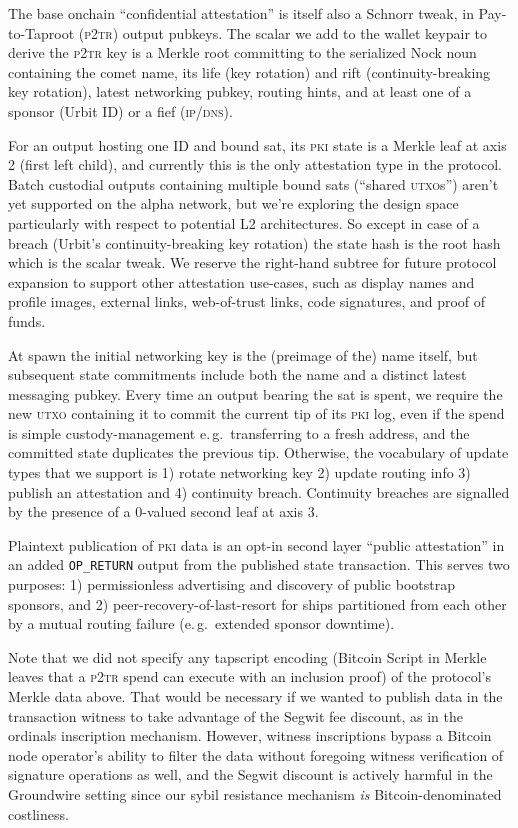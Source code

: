 \documentclass[twoside]{article}
\begin{document}
The base onchain ``confidential attestation'' is itself also a Schnorr
tweak, in Pay-to-Taproot (\textsc{p2tr}) output pubkeys. The scalar we add to the
wallet keypair to derive the \textsc{p2tr} key is a Merkle root committing to the
serialized Nock noun containing the comet name, its life (key rotation)
and rift (continuity-breaking key rotation), latest networking pubkey,
routing hints, and at least one of a sponsor (Urbit ID) or a fief
(\textsc{ip/dns}).

For an output hosting one ID and bound sat, its \textsc{pki} state is a Merkle
leaf at axis 2 (first left child), and currently this is the only
attestation type in the protocol. Batch custodial outputs containing
multiple bound sats (``shared \textsc{utxo}s'') aren't yet supported on the alpha
network, but we're exploring the design space particularly with respect
to potential L2 architectures. So except in case of a breach (Urbit's continuity-breaking key rotation)
the state hash is the root hash which is the scalar tweak. We reserve
the right-hand subtree for future protocol expansion to support other
attestation use-cases, such as display names and profile images,
external links, web-of-trust links, code signatures, and proof of funds.

At spawn the initial networking key is the (preimage of the) name
itself, but subsequent state commitments include both the name and a
distinct latest messaging pubkey. Every time an output bearing the sat
is spent, we require the new \textsc{utxo} containing it to commit the current
tip of its \textsc{pki} log, even if the spend is simple custody-management
e.\,g.\ transferring to a fresh address, and the committed state duplicates
the previous tip. Otherwise, the vocabulary of update types that we
support is 1) rotate networking key 2) update routing info 3) publish an
attestation and 4) continuity breach. Continuity breaches are
signalled by the presence of a 0-valued second leaf at axis 3.

Plaintext publication of \textsc{pki} data is an opt-in second layer ``public
attestation'' in an added \texttt{OP\_RETURN} output from the published
state transaction. This serves two purposes: 1) permissionless
advertising and discovery of public bootstrap sponsors, and 2)
peer-recovery-of-last-resort for ships partitioned from each other by a
mutual routing failure (e.\,g.\ extended sponsor downtime).

Note that we did not specify any tapscript encoding (Bitcoin Script in
Merkle leaves that a \textsc{p2tr} spend can execute with an inclusion proof) of
the protocol's Merkle data above. That would be necessary if we wanted
to publish data in the transaction witness to take advantage of the
Segwit fee discount, as in the ordinals inscription mechanism. However,
witness inscriptions bypass a Bitcoin node operator's ability to filter
the data without foregoing witness verification of signature operations
as well, and the Segwit discount is actively harmful in the Groundwire
setting since our sybil resistance mechanism \emph{is}
Bitcoin-denominated costliness.
\end{document}
